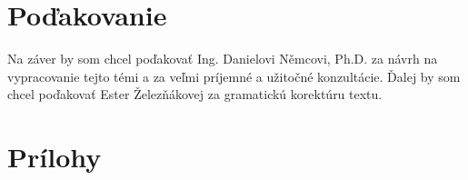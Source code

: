 \documentclass[12pt,a4paper,oneside,final]{article}
\theoremstyle{definition}
\theoremstyle{remark}
\numberwithin{equation}{section}
\begin{document}
\section*{Poďakovanie}
Na záver by som chcel poďakovať Ing. Danielovi Němcovi, Ph.D. za návrh na vypracovanie
tejto témi a za veľmi príjemné a užitočné konzultácie. Ďalej by som chcel poďakovať Ester
Železňákovej za gramatickú korektúru textu.




\newpage
\renewcommand{\thesection}{\Alph{section}}
\setcounter{section}{0}
\renewcommand{\thepage}{\roman{page}}
\setcounter{page}{1}

\section{Prílohy}
\label{priloha}
\end{document}
